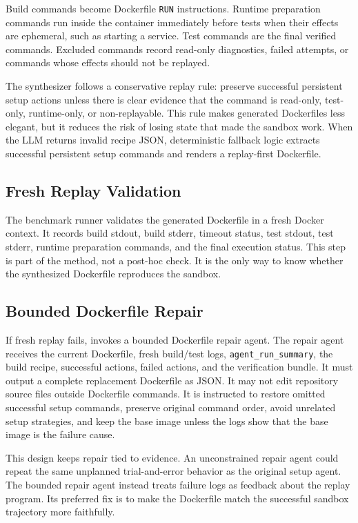 Build commands become Dockerfile \texttt{RUN} instructions.
Runtime preparation commands run inside the container immediately before tests when their effects are ephemeral, such as starting a service.
Test commands are the final verified commands.
Excluded commands record read-only diagnostics, failed attempts, or commands whose effects should not be replayed.

The synthesizer follows a conservative replay rule: preserve successful persistent setup actions unless there is clear evidence that the command is read-only, test-only, runtime-only, or non-replayable.
This rule makes generated Dockerfiles less elegant, but it reduces the risk of losing state that made the sandbox work.
When the LLM returns invalid recipe JSON, deterministic fallback logic extracts successful persistent setup commands and renders a replay-first Dockerfile.

\subsection{Fresh Replay Validation}

The benchmark runner validates the generated Dockerfile in a fresh Docker context.
It records build stdout, build stderr, timeout status, test stdout, test stderr, runtime preparation commands, and the final execution status.
This step is part of the method, not a post-hoc check.
It is the only way to know whether the synthesized Dockerfile reproduces the sandbox.

\subsection{Bounded Dockerfile Repair}

If fresh replay fails, \tool invokes a bounded Dockerfile repair agent.
The repair agent receives the current Dockerfile, fresh build/test logs, \texttt{agent\_run\_summary}, the build recipe, successful actions, failed actions, and the verification bundle.
It must output a complete replacement Dockerfile as JSON.
It may not edit repository source files outside Dockerfile commands.
It is instructed to restore omitted successful setup commands, preserve original command order, avoid unrelated setup strategies, and keep the base image unless the logs show that the base image is the failure cause.

This design keeps repair tied to evidence.
An unconstrained repair agent could repeat the same unplanned trial-and-error behavior as the original setup agent.
The bounded repair agent instead treats failure logs as feedback about the replay program.
Its preferred fix is to make the Dockerfile match the successful sandbox trajectory more faithfully.

